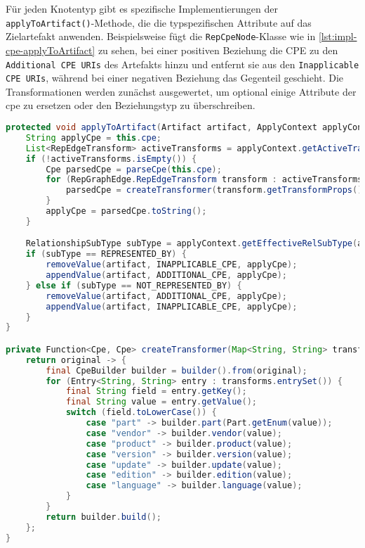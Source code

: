 Für jeden Knotentyp gibt es spezifische Implementierungen der \texttt{applyToArtifact()}-Methode, die die typspezifischen Attribute auf das Zielartefakt anwenden.
Beispielsweise fügt die \texttt{RepCpeNode}-Klasse wie in \autoref{lst:impl-cpe-applyToArtifact} zu sehen, bei einer positiven Beziehung die CPE zu den \texttt{Additional CPE URIs} des Artefakts hinzu und entfernt sie aus den \texttt{Inapplicable CPE URIs}, während bei einer negativen Beziehung das Gegenteil geschieht.
Die Transformationen werden zunächst ausgewertet, um optional einige Attribute der \acrshort{cpe} zu ersetzen oder den Beziehungstyp zu überschreiben.

\begin{lstlisting}[language=Java,caption={Methode \texttt{applyToArtifact} in \texttt{RepNodeCpe}},label=lst:impl-cpe-applyToArtifact,basicstyle=\ttfamily\scriptsize]
protected void applyToArtifact(Artifact artifact, ApplyContext applyContext) {
    String applyCpe = this.cpe;
    List<RepEdgeTransform> activeTransforms = applyContext.getActiveTransforms(this);
    if (!activeTransforms.isEmpty()) {
        Cpe parsedCpe = parseCpe(this.cpe);
        for (RepGraphEdge.RepEdgeTransform transform : activeTransforms) {
            parsedCpe = createTransformer(transform.getTransformProps()).apply(parsedCpe);
        }
        applyCpe = parsedCpe.toString();
    }

    RelationshipSubType subType = applyContext.getEffectiveRelSubType(activeTransforms);
    if (subType == REPRESENTED_BY) {
        removeValue(artifact, INAPPLICABLE_CPE, applyCpe);
        appendValue(artifact, ADDITIONAL_CPE, applyCpe);
    } else if (subType == NOT_REPRESENTED_BY) {
        removeValue(artifact, ADDITIONAL_CPE, applyCpe);
        appendValue(artifact, INAPPLICABLE_CPE, applyCpe);
    }
}

private Function<Cpe, Cpe> createTransformer(Map<String, String> transforms) {
    return original -> {
        final CpeBuilder builder = builder().from(original);
        for (Entry<String, String> entry : transforms.entrySet()) {
            final String field = entry.getKey();
            final String value = entry.getValue();
            switch (field.toLowerCase()) {
                case "part" -> builder.part(Part.getEnum(value));
                case "vendor" -> builder.vendor(value);
                case "product" -> builder.product(value);
                case "version" -> builder.version(value);
                case "update" -> builder.update(value);
                case "edition" -> builder.edition(value);
                case "language" -> builder.language(value);
            }
        }
        return builder.build();
    };
}
\end{lstlisting}

